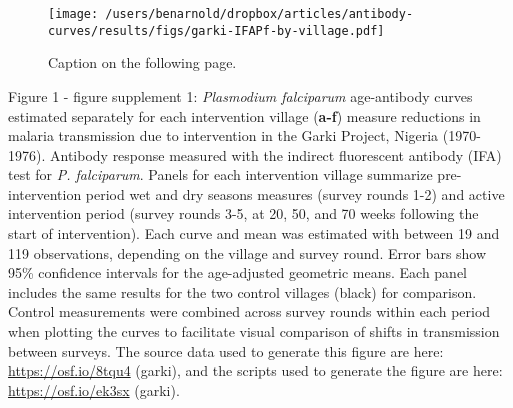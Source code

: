 \documentclass[11pt]{article}
\begin{document}
\renewcommand{\figurename}{Figure}
\setcounter{figure}{0} 
\renewcommand{\thefigure}{1 - figure supplement \arabic{figure} }



\clearpage
\setcounter{figure}{0} 
\begin{figure}[htbp]
\begin{center}
\texttt{[image: /users/benarnold/dropbox/articles/antibody-curves/results/figs/garki-IFAPf-by-village.pdf]}
\begin{minipage}{\textwidth}
\caption{Caption on the following page.}
\label{fig:garkiVillageEy}
\end{minipage}
\end{center}
\end{figure}
\clearpage
Figure 1 - figure supplement 1: \textit{Plasmodium falciparum} age-antibody curves estimated separately for each intervention village (\textbf{a-f}) measure reductions in malaria transmission due to intervention in the Garki Project, Nigeria (1970-1976).  Antibody response measured with the indirect fluorescent antibody (IFA) test for \textit{P. falciparum}. Panels for each intervention village summarize pre-intervention period wet and dry seasons measures (survey rounds 1-2) and active intervention period (survey rounds 3-5, at 20, 50, and 70 weeks following the start of intervention). Each curve and mean was estimated with between 19 and 119 observations, depending on the village and survey round.  Error bars show 95\% confidence intervals for the age-adjusted geometric means. Each panel includes the same results for the two control villages (black) for comparison.  Control measurements were combined across survey rounds within each period when plotting the curves to facilitate visual comparison of shifts in transmission between surveys. The source data used to generate this figure are here: \url{https://osf.io/8tqu4} (garki), and the scripts used to generate the figure are here: \url{https://osf.io/ek3sx} (garki). 
\end{document}
